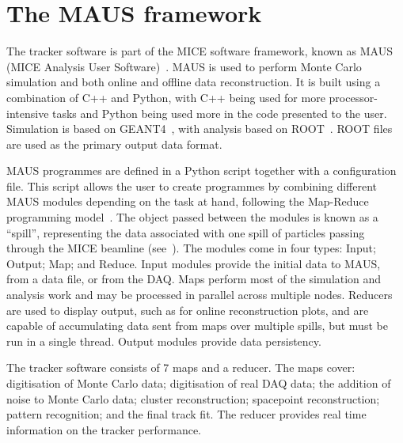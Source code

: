 \section{The MAUS framework}
\label{sec:MAUS}
The tracker software is part of the MICE software framework, known as MAUS (MICE Analysis User Software)~\cite{MausIPAC11}. MAUS is used to perform Monte Carlo simulation and both online and offline data reconstruction. It is built using a combination of C++ and Python, with C++ being used for more processor-intensive tasks and Python being used more in the code presented to the user.  Simulation is based on GEANT4~\cite{GEANT4}, with analysis based on ROOT~\cite{ROOT}.  ROOT files are used as the primary output data format. %

MAUS programmes are defined in a Python script together with a configuration file.  This script allows the user to create programmes by combining different MAUS modules depending on the task at hand, following the Map-Reduce programming model~\cite{MapReduce}. The object passed between the modules is known as a ``spill'', representing the data associated with one spill of particles passing through the MICE beamline (see~\cite{MiceBeamline}).  The modules come in four types: Input; Output; Map; and Reduce.  Input modules provide the initial data to MAUS, from a data file, or from the DAQ. Maps perform most of the simulation and analysis work and may be processed in parallel across multiple nodes.  Reducers are used to display output, such as for online reconstruction plots, and are capable of accumulating data sent from maps over multiple spills, but must be run in a single thread. Output modules provide data persistency.

The tracker software consists of 7 maps and a reducer. The maps cover: digitisation of Monte Carlo data; digitisation of real DAQ data; the addition of noise to Monte Carlo data; cluster reconstruction; spacepoint reconstruction; pattern recognition; and the final track fit. The reducer provides real time information on the tracker performance.  %